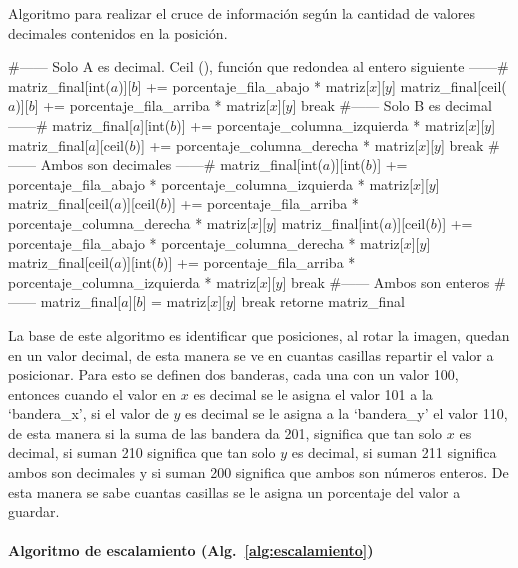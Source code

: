 \begin{algorithm}
\caption{Algoritmo para realizar el cruce de información según la
cantidad de valores decimales contenidos en la posición.}\label{alg:cruce}
\label{alg:cruce}
\begin{algorithmic}[1]
\STATE \#------ Solo A es decimal. Ceil (), función que redondea al entero siguiente ------\#
\STATE matriz\_final[int($a$)][$b$] += porcentaje\_fila\_abajo * matriz[$x$][$y$]
\STATE matriz\_final[ceil($a$)][$b$] += porcentaje\_fila\_arriba * matriz[$x$][$y$]
\STATE break
\ENDIF
\STATE \#------ Solo B es decimal ------\#
\STATE matriz\_final[$a$][int($b$)] += porcentaje\_columna\_izquierda * matriz[$x$][$y$]
\STATE matriz\_final[$a$][ceil($b$)] += porcentaje\_columna\_derecha * matriz[$x$][$y$]
\STATE break
\ENDIF
\STATE \#------ Ambos son decimales ------\#
\STATE matriz\_final[int($a$)][int($b$)] += porcentaje\_fila\_abajo * porcentaje\_columna\_izquierda * matriz[$x$][$y$]
\STATE matriz\_final[ceil($a$)][ceil($b$)] += porcentaje\_fila\_arriba * porcentaje\_columna\_derecha * matriz[$x$][$y$]
\STATE matriz\_final[int($a$)][ceil($b$)] += porcentaje\_fila\_abajo * porcentaje\_columna\_derecha * matriz[$x$][$y$]
\STATE matriz\_final[ceil($a$)][int($b$)] += porcentaje\_fila\_arriba * porcentaje\_columna\_izquierda * matriz[$x$][$y$]
\STATE break
\ENDIF
\STATE \#------ Ambos son enteros \#------
\STATE matriz\_final[$a$][$b$] = matriz[$x$][$y$]
\STATE break
\ENDIF    
\STATE retorne matriz\_final
\end{algorithmic}
\end{algorithm}

La base de este algoritmo es identificar que posiciones, al rotar la
imagen, quedan en un valor decimal, de esta manera se ve en cuantas
casillas repartir el valor a posicionar. Para esto se definen dos
banderas, cada una con un valor 100, entonces cuando el valor en $x$
es decimal se le asigna el valor 101 a la ‘bandera\_x’, si el valor de
$y$ es decimal se le asigna a la ‘bandera\_y’ el valor 110, de esta
manera si la suma de las bandera da 201, significa que tan solo $x$ es
decimal, si suman 210 significa que tan solo $y$ es decimal, si suman
211 significa ambos son decimales y si suman 200 significa que ambos
son números enteros. De esta manera se sabe cuantas casillas se le
asigna un porcentaje del valor a guardar.

\paragraph{Algoritmo de escalamiento (Alg.~\ref{alg:escalamiento})}

